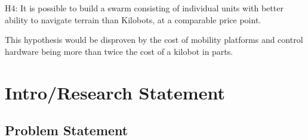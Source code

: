 
H4: It is possible to build a swarm consisting of individual units with better ability to navigate terrain than Kilobots, at a comparable price point. 

This hypothesis would be disproven by the cost of mobility platforms and control hardware being more than twice the cost of a kilobot in parts. 

\section{Intro/Research Statement}

\subsection{Problem Statement}


